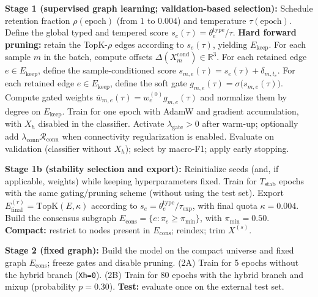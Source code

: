 \documentclass[11pt,a4paper]{article}
\newcommand{\R}{\mathbb{R}}
\newcommand{\sigmoid}{\sigma}
\begin{document}
\begin{algorithm}[H]
\begin{algorithmic}[1]
\State \textbf{Stage 1 (supervised graph learning; validation-based selection):}
  \State Schedule retention fraction $\rho(\mathrm{epoch})$ (from $1$ to $0.004$) and temperature $\tau(\mathrm{epoch})$.
  \State Define the global typed and tempered score $s_e(\tau)=\theta^{\mathrm{type}}_e/\tau$.
  \State \textbf{Hard forward pruning:} retain the TopK-$\rho$ edges according to $s_e(\tau)$, yielding $E_{\mathrm{keep}}$.
  \State For each sample $m$ in the batch, compute offsets $\Delta(X_m^{\mathrm{cond}})\in\R^3$.
  \State For each retained edge $e\in E_{\mathrm{keep}}$, define the sample-conditioned score $s_{m,e}(\tau)=s_e(\tau)+\delta_{m,t_e}$.
  \State For each retained edge $e\in E_{\mathrm{keep}}$, define the soft gate $g_{m,e}(\tau)=\sigmoid\!\big(s_{m,e}(\tau)\big)$.
  \State Compute gated weights $\bar w_{m,e}(\tau)=w_e^{(0)}g_{m,e}(\tau)$ and normalize them by degree on $E_{\mathrm{keep}}$.
  \State Train for one epoch with AdamW \citep{Kingma2015Adam,Loshchilov2019AdamW} and gradient accumulation, with $X_h$ disabled in the classifier.
  \State Activate $\lambda_{\mathrm{gate}}>0$ after warm-up; optionally add $\lambda_{\mathrm{conn}}\mathcal{R}_{\mathrm{conn}}$ when connectivity regularization is enabled.
  \State Evaluate on validation (classifier without $X_h$); select by macro-F1; apply early stopping.
\EndFor
\vspace{1mm}

\State \textbf{Stage 1b (stability selection and export):}
  \State Reinitialize seeds (and, if applicable, weights) while keeping hyperparameters fixed.
  \State Train for $T_{\mathrm{stab}}$ epochs with the same gating/pruning scheme (without using the test set).
  \State Export $E^{(r)}_{\mathrm{final}}=\mathrm{TopK}(E,\kappa)$ according to $s_e=\theta^{\mathrm{type}}_e/\tau_{\mathrm{exp}}$, with final quota $\kappa=0.004$.
\EndFor
\State Build the consensus subgraph $E_{\mathrm{cons}}=\{e:\pi_e\ge \pi_{\min}\}$, with $\pi_{\min}=0.50$.
\State \textbf{Compact:} restrict to nodes present in $E_{\mathrm{cons}}$; reindex; trim $X^{(s)}$.
\vspace{1mm}

\State \textbf{Stage 2 (fixed graph):}
\State Build the model on the compact universe and fixed graph $E_{\mathrm{cons}}$; freeze gates and disable pruning.
\State (2A) Train for 5 epochs without the hybrid branch (\texttt{Xh=0}).
\State (2B) Train for 80 epochs with the hybrid branch and mixup (probability $p=0.30$).
\State \textbf{Test:} evaluate once on the external test set.
\end{algorithmic}
\end{algorithm}
\end{document}
